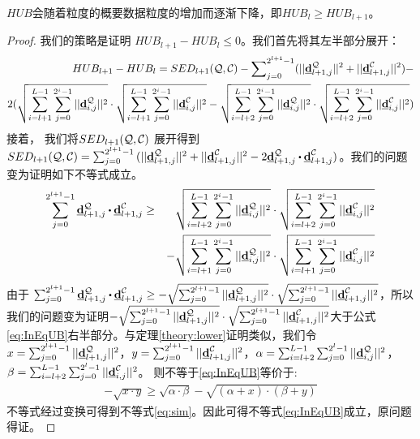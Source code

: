 \begin{theorem}[]\label{theory:upper}
	$HUB$会随着粒度的概要数据粒度的增加而逐渐下降，即$HUB_{l} \ge HUB_{l+1}$。
\end{theorem}
\begin{proof}
	我们的策略是证明 $HUB_{l+1}- HUB_{l}\le 0$。我们首先将其左半部分展开：
	\begin{eqnarray}\label{eq:minusupper}
	HUB_{l+1}- HUB_{l}= SED_{l+1}({\cal Q},{\cal C}) - \sum\nolimits_{j=0}^{2^{l+1}-1}(||\emph{{\textbf{d}}}_{l+1,j}^{\cal Q}||^2  + ||\emph{{\textbf{d}}}_{l+1,j}^{\cal C}||^2) -\nonumber\\
	2(\sqrt{\sum_{i=l+1}^{L -1}\sum_{j=0}^{2^i-1}||\emph{{\textbf{d}}}_{i,j}^{\cal Q}||^2} \cdot \sqrt{\sum_{i=l+1}^{L -1}\sum_{j=0}^{2^i-1}||\emph{{\textbf{d}}}_{i,j}^{\cal C}||^2} -\sqrt{\sum_{i=l+2}^{L -1}\sum_{j=0}^{2^i-1}||\emph{{\textbf{d}}}_{i,j}^{\cal Q}||^2} \cdot \sqrt{\sum_{i=l+2}^{L -1}\sum_{j=0}^{2^i-1}||\emph{{\textbf{d}}}_{i,j}^{\cal C}||^2})\nonumber
	\end{eqnarray}	
	接着， 我们将$SED_{l+1}({\cal Q},{\cal C})$ 展开得到$SED_{l+1}({\cal Q},{\cal C})=\sum_{j=0}^{2^{l+1}-1}{(||\vd_{l+1,j}^{\cal Q}||^2+||\vd_{l+1,j}^{\cal C}||^2}-2 \vd_{l+1,j}^{\cal Q} \bigcdot \vd_{l+1,j}^{\cal C})$。我们的问题变为证明如下不等式成立。
	\begin{eqnarray}\label{eq:InEqUB}
	\sum_{j=0}^{2^{l+1}-1}\vd_{l+1,j}^{\cal Q} \bigcdot \vd_{l+1,j}^{\cal C} &\ge&
	\sqrt{\sum_{i=l+2}^{L-1}\sum_{j=0}^{2^i-1}||\vd_{i,j}^{\cal Q}||^2} \cdot \sqrt{\sum_{i=l+2}^{L-1}\sum_{j=0}^{2^i-1}||\vd_{i,j}^{\cal C}||^2} \nonumber\\
	&\quad&	-		 \sqrt{\sum_{i=l+1}^{L-1}\sum_{j=0}^{2^i-1}||\vd_{i,j}^{\cal Q}||^2} \cdot \sqrt{\sum_{i=l+1}^{L-1}\sum_{j=0}^{2^i-1}||\vd_{i,j}^{\cal C}||^2} 
	\end{eqnarray}	
	由于	$\sum_{j=0}^{2^{l+1}-1}\vd_{l+1,j}^{\cal Q}\bigcdot \vd_{l+1,j}^{\cal C} \ge
	-	\sqrt{\sum_{j=0}^{2^{l+1}-1}||\vd_{l+1,j}^{\cal Q}||^2} \cdot \sqrt{\sum_{j=0}^{2^{l+1}-1}||\vd_{l+1,j}^{\cal C}||^2}$，所以我们的问题变为证明$-\sqrt{\sum_{j=0}^{2^{l+1}-1}||\emph{{\textbf{d}}}_{l+1,j}^{\cal Q}||^2} \cdot \sqrt{\sum_{j=0}^{2^{l+1}-1}||\emph{{\textbf{d}}}_{l+1,j}^{\cal C}||^2} $大于公式\ref{eq:InEqUB}右半部分。与定理\ref{theory:lower}证明类似，我们令$x= \sum_{j=0}^{2^{l+1}-1}||\emph{{\textbf{d}}}_{l+1,j}^{\cal Q}||^2$，$y=\sum_{j=0}^{2^{l+1}-1}||\emph{{\textbf{d}}}_{l+1,j}^{\cal C}||^2$，$\alpha = \sum_{i=l+2}^{L-1}\sum_{j=0}^{2^l-1}||\emph{{\textbf{d}}}_{i,j}^{\cal Q}||^2$，$\beta =  \sum_{i=l+2}^{L-1}\sum_{j=0}^{2^l-1}||\emph{{\textbf{d}}}_{i,j}^{\cal C}||^2$。
	则不等于\ref{eq:InEqUB}等价于:
	\begin{eqnarray}\label{eq:simUB}
	- \sqrt{x \cdot y} \ge  \sqrt{\alpha \cdot \beta}  -  \sqrt{(\alpha+x) \cdot (\beta+y)} 
	\end{eqnarray}	
	不等式经过变换可得到不等式\ref{eq:sim}。因此可得不等式\ref{eq:InEqUB}成立，原问题得证。
\end{proof}

